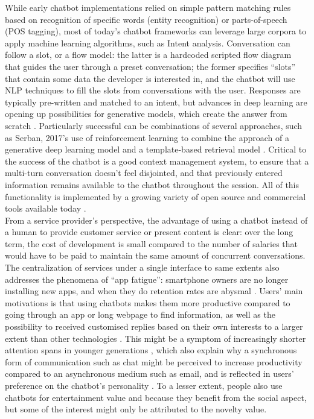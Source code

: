 While early chatbot implementations relied on simple pattern matching rules based on recognition of specific words (entity recognition) or parts-of-speech (POS tagging), most of today's chatbot frameworks can leverage large corpora to apply machine learning algorithms, such as Intent analysis. Conversation can follow a slot, or a flow model: the latter is a hardcoded scripted flow diagram that guides the user through a preset conversation; the former specifies ``slots'' that contain some data the developer is interested in, and the chatbot will use NLP techniques to fill the slots from conversations with the user. Responses are typically pre-written and matched to an intent, but advances in deep learning are opening up possibilities for generative models, which create the answer from scratch \cite{Gregori}. Particularly successful can be combinations of several approaches, such as Serban, 2017's use of reinforcement learning to combine the approach of a generative deep learning model and a template-based retrieval model \cite{Serban2017}. Critical to the success of the chatbot is a good context management system, to ensure that a multi-turn conversation doesn't feel disjointed, and that previously entered information remains available to the chatbot throughout the session. All of this functionality is implemented by a growing variety of open source and commercial tools available today \cite{JavierCouto}.\\
From a service provider's perspective, the advantage of using a chatbot instead of a human to provide customer service or present content is clear: over the long term, the cost of development is small compared to the number of salaries that would have to be paid to maintain the same amount of concurrent conversations. The centralization of services under a single interface to same extents also addresses the phenomena of ``app fatigue'': smartphone owners are no longer installing new apps, and when they do retention rates are abysmal \cite{appfatigue}. Users' main motivations is that using chatbots makes them more productive compared to going through an app or long webpage to find information, as well as the possibility to received customised replies based on their own interests to a larger extent than other technologies \cite{10.1007/978-3-319-70284-1_30}. This might be a symptom of increasingly shorter attention spans in younger generations \cite{Wilmer2017}, which also explain why a synchronous form of communication such as chat might be perceived to increase productivity compared to an asynchronous medium such as email, and is reflected in users' preference on the chatbot's personality \cite{10.1007/978-3-319-67744-6_28}. To a lesser extent, people also use chatbots for entertainment value and because they benefit from the social aspect, but some of the interest might only be attributed to the novelty value. \\
